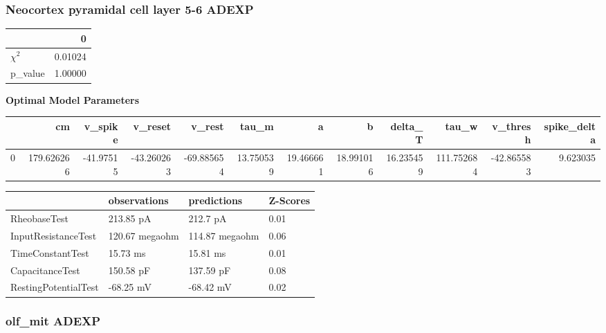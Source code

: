 \subsubsection{Neocortex pyramidal cell layer 5-6 ADEXP}\begin{tabular}{lr}
\toprule
{} &        0 \\
\midrule
$\chi^{2}$ &  0.01024 \\
p\_value    &  1.00000 \\
\bottomrule
\end{tabular}
\textbf{Optimal Model Parameters} \begin{tabular}{lrrrrrrrrrrr}
\toprule
{} &          cm &   v\_spike &    v\_reset &     v\_rest &      tau\_m &          a &          b &    delta\_T &       tau\_w &   v\_thresh &  spike\_delta \\
\midrule
0 &  179.626266 & -41.97515 & -43.260263 & -69.885654 &  13.750539 &  19.466661 &  18.991016 &  16.235459 &  111.752684 & -42.865583 &     9.623035 \\
\bottomrule
\end{tabular}
\begin{tabular}{llll}
\toprule
{} &    observations &     predictions & Z-Scores \\
\midrule
RheobaseTest         &       213.85 pA &        212.7 pA &     0.01 \\
InputResistanceTest  &  120.67 megaohm &  114.87 megaohm &     0.06 \\
TimeConstantTest     &        15.73 ms &        15.81 ms &     0.01 \\
CapacitanceTest      &       150.58 pF &       137.59 pF &     0.08 \\
RestingPotentialTest &       -68.25 mV &       -68.42 mV &     0.02 \\
\bottomrule
\end{tabular}
\subsubsection{olf_mit ADEXP}

